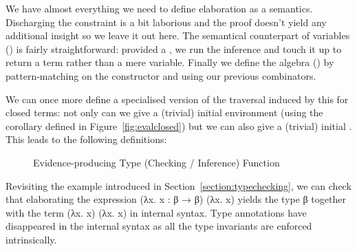 We have almost everything we need to define elaboration as a semantics. Discharging
the  constraint is a bit laborious and the proof doesn't
yield any additional insight so we leave it out here. The semantical counterpart of
variables () is fairly straightforward: provided a , we run the
inference and touch it up to return a term rather than a mere variable. Finally we
define the algebra () by pattern-matching on the constructor and using our
previous combinators.

We can once more define a specialised version of the traversal induced by this
 for closed terms: not only can we give a (trivial) initial
environment (using the  corollary defined in Figure~\ref{fig:evalclosed})
but we can also give a (trivial) initial . This leads to the
following definitions:

\begin{figure}[h]
\begin{minipage}{0.45\textwidth}
\end{minipage}\hfill
\begin{minipage}{0.45\textwidth}
\end{minipage}
\caption{Evidence-producing Type (Checking / Inference) Function}
\end{figure}

Revisiting the example introduced in Section~\ref{section:typechecking},
we can check that elaborating the expression {(λx. x : β → β) (λx. x)}
yields the type {β} together with the term {(λx. x) (λx. x)} in internal
syntax. Type annotations have disappeared in the internal syntax as all
the type invariants are enforced intrinsically.

\begin{figure}[h]
\end{figure}
